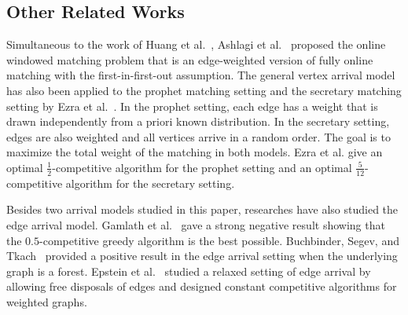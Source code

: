 \subsection{Other Related Works}
Simultaneous to the work of Huang et al.~\cite{jacm/HuangKTWZZ20}, Ashlagi et al.~\cite{ec/AshlagiBDJSS19} proposed the online windowed matching problem that is an edge-weighted version of fully online matching with the first-in-first-out assumption.
The general vertex arrival model has also been applied to the prophet matching setting and the secretary matching setting by Ezra et al.~\cite{ec/EzraFGT20, corr/EzraFGT20}. In the prophet setting, each edge has a weight that is drawn independently from a priori known distribution. In the secretary setting, edges are also weighted and all vertices arrive in a random order. The goal is to maximize the total weight of the matching in both models. Ezra et al. give an optimal $\frac{1}{2}$-competitive algorithm for the prophet setting and an optimal $\frac{5}{12}$-competitive algorithm for the secretary setting.

Besides two arrival models studied in this paper, researches have also studied the edge arrival model. Gamlath et al.~\cite{focs/GamlathKMSW19} gave a strong negative result showing that the $0.5$-competitive greedy algorithm is the best possible. Buchbinder, Segev, and Tkach~\cite{algorithmica/BuchbinderST19} provided a positive result in the edge arrival setting when the underlying graph is a forest. Epstein et al.~\cite{stacs/EpsteinLSW13} studied a relaxed setting of edge arrival by allowing free disposals of edges and designed constant competitive algorithms for weighted graphs.
